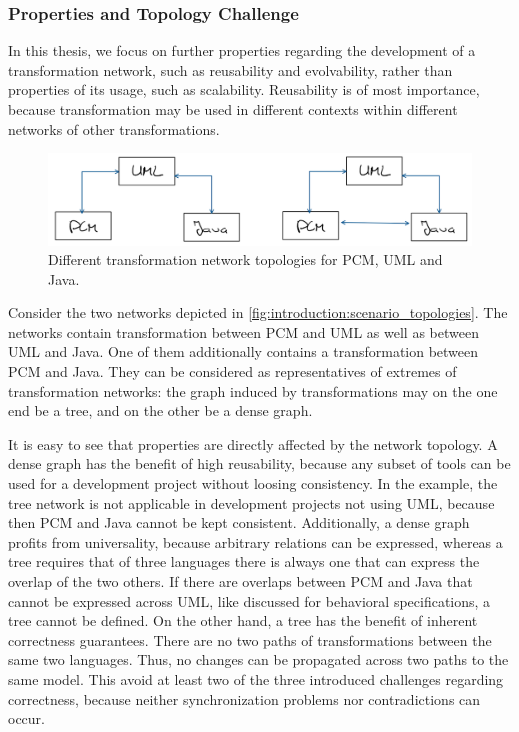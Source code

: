 \subsubsection*{Properties and Topology Challenge}

In this thesis, we focus on further properties regarding the development of a transformation network, such as reusability and evolvability, rather than properties of its usage, such as scalability.
Reusability is of most importance, because transformation may be used in different contexts within different networks of other transformations.

\begin{figure}
    \centering
    \includegraphics[width=\textwidth]{figures/prologue/introduction/scenario_topologies.png}
    \caption[Example for network topologies]{Different transformation network topologies for \gls{PCM}, \gls{UML} and Java.}
    \label{fig:introduction:scenario_topologies}
\end{figure}

Consider the two networks depicted in \autoref{fig:introduction:scenario_topologies}.
The networks contain transformation between \gls{PCM} and \gls{UML} as well as between \gls{UML} and Java. 
One of them additionally contains a transformation between \gls{PCM} and Java.
They can be considered as representatives of extremes of transformation networks:
the graph induced by transformations may on the one end be a tree, and on the other be a dense graph.

It is easy to see that properties are directly affected by the network topology.
A dense graph has the benefit of high reusability, because any subset of tools can be used for a development project without loosing consistency.
In the example, the tree network is not applicable in development projects not using \gls{UML}, because then \gls{PCM} and Java cannot be kept consistent.
Additionally, a dense graph profits from universality, because arbitrary relations can be expressed, whereas a tree requires that of three languages there is always one that can express the overlap of the two others.
If there are overlaps between \gls{PCM} and Java that cannot be expressed across \gls{UML}, like discussed for behavioral specifications, a tree cannot be defined.
On the other hand, a tree has the benefit of inherent correctness guarantees.
There are no two paths of transformations between the same two languages.
Thus, no changes can be propagated across two paths to the same model.
This avoid at least two of the three introduced challenges regarding correctness, because neither synchronization problems nor contradictions can occur.

